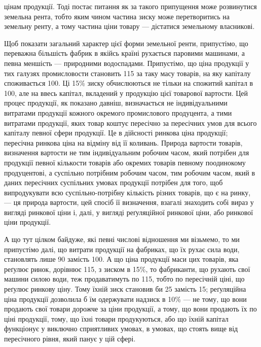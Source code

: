\parcont{}  %
цінам продукції. Тоді постає питання як за такого припущення може розвинутися
земельна рента, тобто яким чином частина зиску може перетворитись на земельну
ренту, а тому частина ціни товару — дістатися земельному власникові.

Щоб показати загальний характер цієї форми земельної ренти, припустімо,
що переважна більшість фабрик в якійсь країні рухається паровими машинами,
а певна меншість — природними водоспадами. Припустімо, що ціна продукції
у тих галузях промисловости становить 115 за таку масу товарів, на яку капіталу
споживається 100. Ці 15\% зиску обчислюються не тільки на спожитий капітал
в 100, але на ввесь капітал, вкладений у продукцію цієї товарової вартости.
Цей процес продукції, як показано давніш, визначається не індивідуальними
витратами продукції кожного окремого промислового продуцента, а тими витратами
продукції, яких товар коштує пересічно за пересічних умов для всього капіталу
певної сфери продукції. Це в дійсності ринкова ціна продукції; пересічна ринкова
ціна на відміну від її коливань. Природа вартости товарів, визначення вартости
не тим індивідуальним робочим часом, який потрібен для продукції певної
кількости товарів або окремих товарів певному поодинокому продуцентові, а
суспільно потрібним робочим часом, тим робочим часом, який в даних пересічних
суспільних умовах продукції потрібен для того, щоб випродукувати всю суспільно-потрібну
кількість різних товарів, що є на ринку, — ця природа вартости,
цей спосіб її визначення, взагалі знаходить собі вираз у вигляді ринкової ціни
і, далі, у вигляді реґуляційної ринкової ціни, або ринкової ціни продукції.

А що тут цілком байдуже, які певні числові відношення ми візьмемо, то ми
припустімо далі, що витрати продукції на фабриках, що їх рухає сила води,
становлять лише 90 замість 100. А що ціна продукції маси цих товарів, яка
реґулює ринок, дорівнює 115, з зиском в 15\%, то фабриканти, що рухають
свої машини силою води, теж продаватимуть по 115, тобто по пересічній ціні,
що реґулює ринкову ціну. Тому їхній зиск становив би 25 замість 15; реґуляційна
ціна продукції дозволила б їм одержувати надзиск в 10\% — не тому, що вони
продають свої товари дорожче за ціни продукції, а тому, що вони продають
їх по ціні продукції, тому, що їхні товари продукуються, або що їхній капітал
функціонує у виключно сприятливих умовах, в умовах, що стоять вище від пересічного
рівня, який панує у цій сфері.


